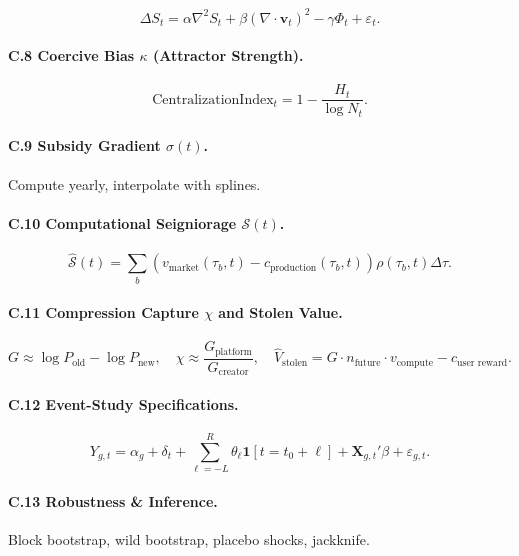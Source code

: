 \documentclass[12pt]{article}
\begin{document}
\[
\Delta S_t = \alpha \nabla^2 S_t + \beta (\nabla \cdot \mathbf{v}_t)^2 - \gamma \Phi_t + \varepsilon_t.
\]

\paragraph{C.8 Coercive Bias \(\kappa\) (Attractor Strength).}

\[
\text{CentralizationIndex}_t = 1 - \frac{H_t}{\log N_t}.
\]

\paragraph{C.9 Subsidy Gradient \(\sigma(t)\).}

Compute yearly, interpolate with splines.

\paragraph{C.10 Computational Seigniorage \(\mathcal{S}(t)\).}

\[
\widehat{\mathcal{S}}(t) = \sum_b (v_{\text{market}}(\tau_b, t) - c_{\text{production}}(\tau_b, t)) \rho(\tau_b, t) \Delta \tau.
\]

\paragraph{C.11 Compression Capture \(\chi\) and Stolen Value.}

\[
G \approx \log P_{\text{old}} - \log P_{\text{new}}, \quad \chi \approx \frac{G_{\text{platform}}}{G_{\text{creator}}}, \quad \widehat{V}_{\text{stolen}} = G \cdot n_{\text{future}} \cdot v_{\text{compute}} - c_{\text{user reward}}.
\]

\paragraph{C.12 Event-Study Specifications.}

\[
Y_{g,t} = \alpha_g + \delta_t + \sum_{\ell = -L}^R \theta_\ell \mathbf{1}[t = t_0 + \ell] + \mathbf{X}_{g,t}' \beta + \varepsilon_{g,t}.
\]

\paragraph{C.13 Robustness \& Inference.}

Block bootstrap, wild bootstrap, placebo shocks, jackknife.
\end{document}
